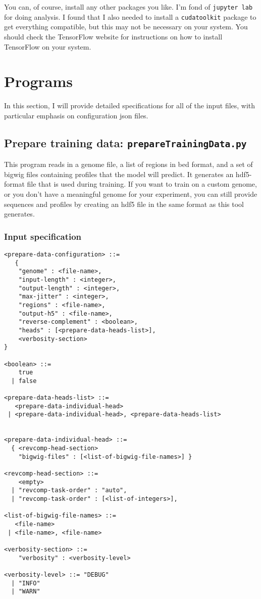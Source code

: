 \documentclass{article}
\begin{document}
You can, of course, install any other packages you like.
I'm fond of \texttt{jupyter lab} for doing analysis.
I found that I also needed to install a \texttt{cudatoolkit} package to get everything compatible, but this may not be necessary on your system.
You should check the TensorFlow website for instructions on how to install TensorFlow on your system. 


\newpage

\section{Programs}

In this section, I will provide detailed specifications for all of the input files, with particular emphasis on configuration json files.

\newpage
\subsection{Prepare training data: \texttt{prepareTrainingData.py}}

This program reads in a genome file, a list of regions in bed format, and a set of bigwig files containing profiles that the model will predict.
It generates an hdf5-format file that is used during training.
If you want to train on a custom genome, or you don't have a meaningful genome for your experiment, you can still provide sequences and profiles by creating an hdf5 file in the same format as this tool generates.

\subsubsection{Input specification}

\begin{lstlisting}
<prepare-data-configuration> ::=
   {
    "genome" : <file-name>,
    "input-length" : <integer>,
    "output-length" : <integer>,
    "max-jitter" : <integer>,
    "regions" : <file-name>,
    "output-h5" : <file-name>,
    "reverse-complement" : <boolean>,
    "heads" : [<prepare-data-heads-list>],
    <verbosity-section>
}

<boolean> ::=
    true
  | false

<prepare-data-heads-list> ::=
   <prepare-data-individual-head>
 | <prepare-data-individual-head>, <prepare-data-heads-list>


<prepare-data-individual-head> ::=
  { <revcomp-head-section>
    "bigwig-files" : [<list-of-bigwig-file-names>] }

<revcomp-head-section> ::=
    <empty>
  | "revcomp-task-order" : "auto",
  | "revcomp-task-order" : [<list-of-integers>],

<list-of-bigwig-file-names> ::=
   <file-name>
 | <file-name>, <file-name>

<verbosity-section> ::=
    "verbosity" : <verbosity-level>

<verbosity-level> ::= "DEBUG"
  | "INFO"
  | "WARN"

\end{lstlisting}
\end{document}
